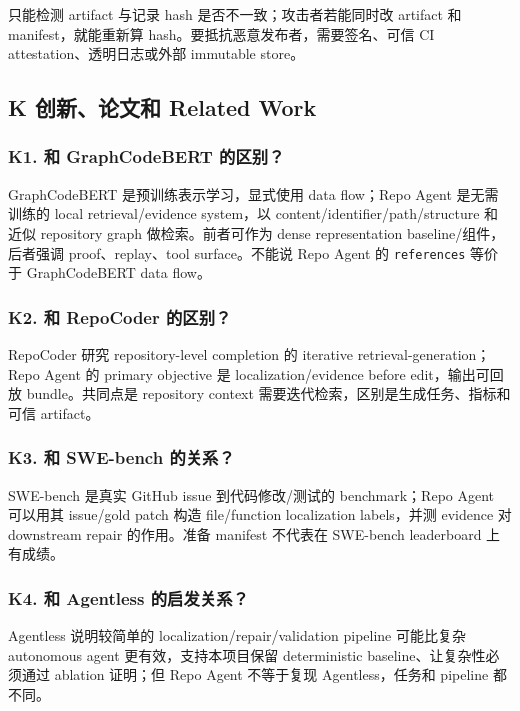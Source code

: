 \documentclass[UTF8,12pt,openany]{ctexbook}
\begin{document}
只能检测 artifact 与记录 hash 是否不一致；攻击者若能同时改 artifact 和 manifest，就能重新算 hash。要抵抗恶意发布者，需要签名、可信 CI attestation、透明日志或外部 immutable store。\par

\subsection{K 创新、论文和 Related Work}

\subsubsection{K1. 和 GraphCodeBERT 的区别？}

GraphCodeBERT 是预训练表示学习，显式使用 data flow；Repo Agent 是无需训练的 local retrieval/evidence system，以 content/identifier/path/structure 和近似 repository graph 做检索。前者可作为 dense representation baseline/组件，后者强调 proof、replay、tool surface。不能说 Repo Agent 的 \texttt{references} 等价于 GraphCodeBERT data flow。\par

\subsubsection{K2. 和 RepoCoder 的区别？}

RepoCoder 研究 repository-level completion 的 iterative retrieval-generation；Repo Agent 的 primary objective 是 localization/evidence before edit，输出可回放 bundle。共同点是 repository context 需要迭代检索，区别是生成任务、指标和可信 artifact。\par

\subsubsection{K3. 和 SWE-bench 的关系？}

SWE-bench 是真实 GitHub issue 到代码修改/测试的 benchmark；Repo Agent 可以用其 issue/gold patch 构造 file/function localization labels，并测 evidence 对 downstream repair 的作用。准备 manifest 不代表在 SWE-bench leaderboard 上有成绩。\par

\subsubsection{K4. 和 Agentless 的启发关系？}

Agentless 说明较简单的 localization/repair/validation pipeline 可能比复杂 autonomous agent 更有效，支持本项目保留 deterministic baseline、让复杂性必须通过 ablation 证明；但 Repo Agent 不等于复现 Agentless，任务和 pipeline 都不同。\par
\end{document}
